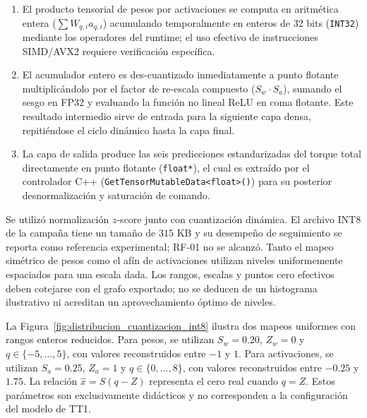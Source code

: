 \documentclass[12pt]{article}
\begin{document}
\begin{enumerate}
\begin{itemize}
\begin{enumerate}
            \begin{equation}
                S_a = \frac{a_{max} - a_{min}}{q_{max}-q_{min}}, \qquad Z_a = \text{round}\left(q_{min}-\frac{a_{min}}{S_a}\right)
            \end{equation}
            cuantizando el vector sobre la marcha (\texttt{DynamicQuantizeLinear}) a enteros de 8 bits. Aquí $q_{min}$ y $q_{max}$ delimitan el tipo entero de activaciones definido por el grafo. No se infiere un punto cero fijo de $-128$ sólo por utilizar pesos QInt8.
            \item El producto tensorial de pesos por activaciones se computa en aritmética entera ($\sum W_{q,i} a_{q,i}$) acumulando temporalmente en enteros de 32 bits (\texttt{INT32}) mediante los operadores del runtime; el uso efectivo de instrucciones SIMD/AVX2 requiere verificación específica.
            \item El acumulador entero es des-cuantizado inmediatamente a punto flotante multiplicándolo por el factor de re-escala compuesto ($S_w \cdot S_a$), sumando el sesgo en FP32 y evaluando la función no lineal ReLU en coma flotante. Este resultado intermedio sirve de entrada para la siguiente capa densa, repitiéndose el ciclo dinámico hasta la capa final.
            \item La capa de salida produce las seis predicciones estandarizadas del torque total directamente en punto flotante (\texttt{float*}), el cual es extraído por el controlador C++ (\texttt{GetTensorMutableData<float>()}) para su posterior desnormalización y saturación de comando.
        \end{enumerate}
    \end{itemize}
\end{enumerate}

Se utilizó normalización $z$-score junto con cuantización dinámica. El archivo INT8 de la campaña tiene un tamaño de $315$ KB y su desempeño de seguimiento se reporta como referencia experimental; RF-01 no se alcanzó. Tanto el mapeo simétrico de pesos como el afín de activaciones utilizan niveles uniformemente espaciados para una escala dada. Los rangos, escalas y puntos cero efectivos deben cotejarse con el grafo exportado; no se deducen de un histograma ilustrativo ni acreditan un aprovechamiento óptimo de niveles.

La Figura~\ref{fig:distribucion_cuantizacion_int8} ilustra dos mapeos uniformes con rangos enteros reducidos. Para pesos, se utilizan $S_w=0.20$, $Z_w=0$ y $q\in\{-5,\ldots,5\}$, con valores reconstruidos entre $-1$ y $1$. Para activaciones, se utilizan $S_a=0.25$, $Z_a=1$ y $q\in\{0,\ldots,8\}$, con valores reconstruidos entre $-0.25$ y $1.75$. La relación $\hat{x}=S(q-Z)$ representa el cero real cuando $q=Z$. Estos parámetros son exclusivamente didácticos y no corresponden a la configuración del modelo de TT1.
\end{document}

